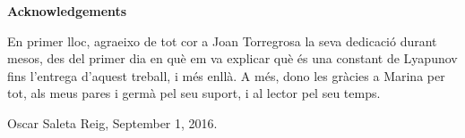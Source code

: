 \newenvironment{acknowledgements}%
{\clearpage%
\null\vfill\begin{center}%
\bfseries Acknowledgements\end{center}}%
{\vfill\null}
\begin{acknowledgements}
En primer lloc, agraeixo de tot cor a Joan Torregrosa la seva dedicació durant mesos, des del primer dia en què em va explicar què és una constant de Lyapunov fins l'entrega d'aquest treball, i més enllà. A més, dono les gràcies a Marina per tot, als meus pares i germà pel seu suport, i al lector pel seu temps.

\begin{flushright}
Oscar Saleta Reig, September 1, 2016.
\end{flushright}
\end{acknowledgements}

